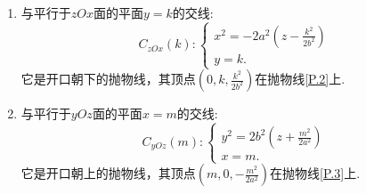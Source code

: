 \begin{enumerate}
\begin{enumerate}
\begin{enumerate}
			\item 与平行于$zOx$面的平面$ y = k $的交线:
			\begin{equation}
			C_{zOx}(k):
			\begin{cases}
			\displaystyle x^2=-2a^2\left(z-\frac{k^2}{2b^2}\right)\\
			y=k.
			\end{cases}
			\end{equation}
			它是开口朝下的抛物线，其顶点$\displaystyle \left(0,k,\frac{k^2}{2b^2}\right)$在抛物线\eqref{P.2}上.

			\item 与平行于$yOz$面的平面$ x = m $的交线:
			\begin{equation}
			C_{yOz}(m):
			\begin{cases}
			\displaystyle y^2=2b^2\left(z+\frac{m^2}{2a^2}\right)\\
			x=m.
			\end{cases}
			\end{equation}
			它是开口朝上的抛物线，其顶点$\displaystyle \left(m,0,-\frac{m^2}{2a^2} \right)$在抛物线\eqref{P.3}上.
		\end{enumerate}
\end{enumerate}
\end{enumerate}

